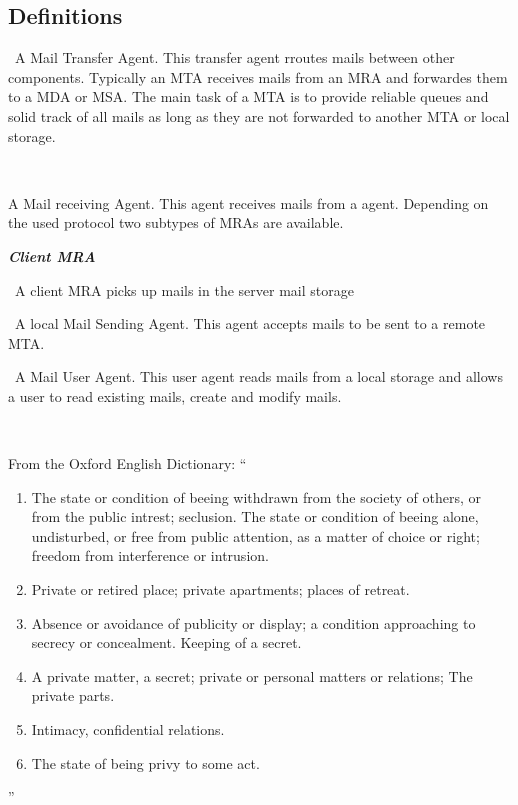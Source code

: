 \documentclass[11pt,a4paper]{book}
\newenvironment{entry}{\par\leavevmode\hangpara{1.5mm}{1}\ignorespaces}{\RaggedRight\par}
\newcommand*{\mainentry}[1]{{\bfseries{#1}}~}
\newcommand*{\subentry}[1]{{\par\indent\hangpara{3mm}{1}\bfseries{\itshape{#1}}}~}
\begin{document}
\backmatter
\begin{appendices}
\chapter{Definitions}
\begin{entry}\mainentry{MTA}{A Mail Transfer Agent. This transfer agent rroutes mails between other components. Typically  an MTA receives mails from an MRA and forwardes them to a MDA or MSA. The main task of a MTA is to provide reliable queues and solid track of all mails as long as they are not forwarded to another MTA or local storage.}\end{entry}
\begin{entry}\mainentry{MRA}{A Mail receiving Agent. This agent receives mails from a agent. Depending on the used protocol two subtypes of MRAs are available.
\subentry{Client MRA}{A client MRA picks up mails in the server mail storage }}\end{entry}
\begin{entry}\mainentry{MSA}{A local Mail Sending Agent. This agent accepts mails to be sent to a remote MTA. }\end{entry}
\begin{entry}\mainentry{MUA}{A Mail User Agent. This user agent reads mails from a local storage and allows a user to read existing mails, create and modify mails.}\end{entry}
\begin{entry}\mainentry{Privacy}{From the Oxford English Dictionary: ``
  \begin{enumerate}
    \item The state or condition of beeing withdrawn from the society of others, or from the public intrest; seclusion. The state or condition of beeing alone, undisturbed, or free from public attention, as a matter of choice or right; freedom from interference or intrusion.
    \item Private or retired place; private apartments; places of retreat.
    \item Absence or avoidance of publicity or display; a condition approaching to secrecy or concealment. Keeping of a secret.
    \item A private matter, a secret; private or personal matters or relations; The private parts.
    \item Intimacy, confidential relations.
    \item The state of being privy to some act.
  \end{enumerate}''\cite[FIXME]{OXFORD}\par
  
}
\end{entry}
\end{appendices}
\end{document}
